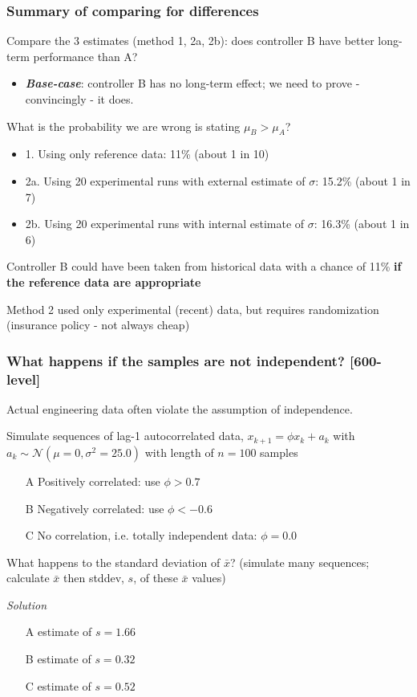 \begin{frame}\frametitle{Summary of comparing for differences}

	Compare the 3 estimates (method 1, 2a, 2b): does controller B have better long-term performance than A?
	\begin{itemize}
		\item	\textbf{\emph{Base-case}}: controller B has no long-term effect; we need to prove - convincingly - it does.
	\end{itemize}

	What is the probability we are wrong is stating $\mu_B > \mu_A$?
	\begin{itemize}
		\item	1. Using only reference data: 11\% (about 1 in 10)
		\item	2a. Using 20 experimental runs with external estimate of $\sigma$: 15.2\% (about 1 in 7)
		\item	2b. Using 20 experimental runs with internal estimate of $\sigma$: 16.3\% (about 1 in 6)
	\end{itemize}

	Controller B could have been taken from historical data with a chance of 11\% \textbf{if the reference data are appropriate}

	Method 2 used only experimental (recent) data, but requires randomization (insurance policy - not always cheap)
\end{frame}

\begin{frame}\frametitle{What happens if the samples are not independent? [600-level]}
	Actual engineering data often violate the assumption of independence.

	Simulate sequences of lag-1 autocorrelated data, $x_{k+1} = \phi x_{k} + a_k$ with $a_k \sim \mathcal{N}\left(\mu=0, \sigma^2 = 25.0 \right)$ with length of $n=100$ samples
	\begin{itemize}
		\item[A]	Positively correlated: use $\phi > 0.7$
		\item[B]	Negatively correlated: use $\phi < -0.6$
		\item[C]	No correlation, i.e. totally independent data: $\phi = 0.0$
	\end{itemize}

	What happens to the standard deviation of $\bar{x}$? (simulate many sequences; calculate $\bar{x}$ then stddev, $s$, of these $\bar{x}$ values)

	\myhrule
	\emph{Solution}
	\begin{itemize}
		\item[A]	estimate of $s = 1.66$
		\item[B]	estimate of $s = 0.32$
		\item[C]	estimate of $s = 0.52$ {}
	\end{itemize}
\end{frame}

